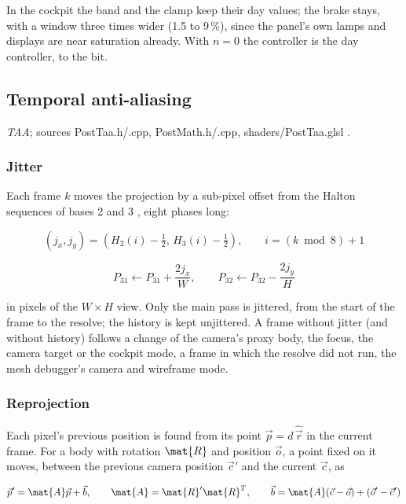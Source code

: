 \documentclass[Orbiter Technical Reference.tex]{subfiles}
\begin{document}
\begin{sloppypar}
\noindent
In the cockpit the band and the clamp keep their day values; the brake stays, with a window three times wider (1.5 to 9\,\%), since the panel's own lamps and displays are near saturation already. With $n = 0$ the controller is the day controller, to the bit.


\subsection{Temporal anti-aliasing}\label{sec:vk_taa}
\textit{TAA}; sources PostTaa.h/.cpp, PostMath.h/.cpp, shaders/PostTaa.glsl \cite{karis2014taa, salvi2016}.

\subsubsection{Jitter}
Each frame $k$ moves the projection by a sub-pixel offset from the Halton sequences of bases 2 and 3 \cite{karis2014taa}, eight phases long:

\[ (j_{x}, j_{y}) = \left(H_{2}(i) - \tfrac{1}{2},\, H_{3}(i) - \tfrac{1}{2}\right), \qquad i = (k \bmod 8) + 1 \]

\[ P_{31} \leftarrow P_{31} + \frac{2j_{x}}{W}, \qquad P_{32} \leftarrow P_{32} - \frac{2j_{y}}{H} \]

\noindent
in pixels of the $W \times H$ view. Only the main pass is jittered, from the start of the frame to the resolve; the history is kept unjittered. A frame without jitter (and without history) follows a change of the camera's proxy body, the focus, the camera target or the cockpit mode, a frame in which the resolve did not run, the mesh debugger's camera and wireframe mode.

\subsubsection{Reprojection}
Each pixel's previous position is found from its point $\vec{p} = d\,\hat{\vec{r}}$ in the current frame. For a body with rotation $\mat{R}$ and position $\vec{o}$, a point fixed on it moves, between the previous camera position $\vec{c}'$ and the current $\vec{c}$, as

\[ \vec{p}' = \mat{A}\vec{p} + \vec{b}, \qquad \mat{A} = \mat{R}'\mat{R}^{T}, \qquad \vec{b} = \mat{A}(\vec{c} - \vec{o}) + (\vec{o}' - \vec{c}') \]


\end{sloppypar}
\end{document}
